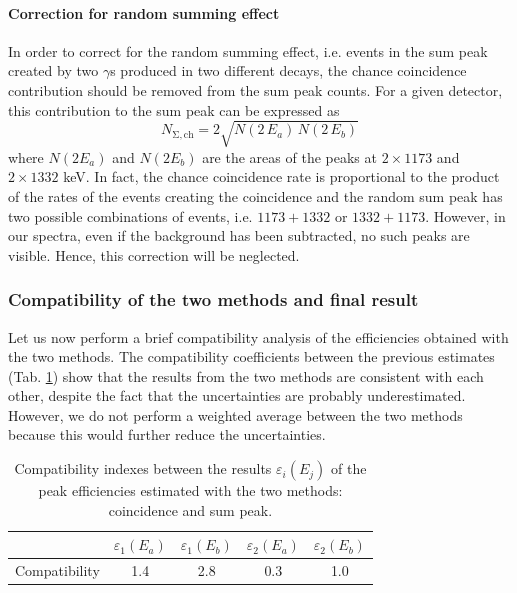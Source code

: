 \documentclass[a4paper]{article}
\begin{document}
\paragraph{Correction for random summing effect}
In order to correct for the random summing effect, i.e. events in the sum peak created by two $\gamma$s produced in two different decays, the chance coincidence contribution should be removed from the sum peak counts. For a given detector, this contribution to the sum peak can be expressed as
\begin{equation}
    N_\mathrm{\Sigma,ch}=2\sqrt{N(2\,E_a)\,N(2\,E_b)}
\end{equation}
where $N(2E_a)$ and $N(2E_b)$ are the areas of the peaks at $2\times 1173$ and $2\times1332$ keV. In fact, the chance coincidence rate is proportional to the product of the rates of the events creating the coincidence and the random sum peak has two possible combinations of events, i.e. $1173+1332$ or $1332+1173$. 
However, in our spectra, even if the background has been subtracted, no such peaks are visible. %
Hence, this correction will be neglected.

\subsubsection{Compatibility of the two methods and final result}
Let us now perform a brief compatibility analysis of the efficiencies obtained with the two methods. The compatibility coefficients between the previous estimates (Tab. \ref{tab:compatibilities and means}) show that the results from the two methods are consistent with each other, despite the fact that the uncertainties are probably underestimated. However, we do not perform a weighted average between the two methods because this would further reduce the uncertainties.
\begin{table}[H]
    \centering
    \captionsetup{width=0.85\linewidth}
    \begin{tabular}{|l|cc|cc|}
         \hline
         & $\varepsilon_{1}(E_a)$&$\varepsilon_{1}(E_b)$&$\varepsilon_{2}(E_a)$& $\varepsilon_{2}(E_b)$\\
         \hline
          Compatibility& 1.4&2.8&0.3&1.0\\
          \hline
    \end{tabular}
    \caption{Compatibility indexes between the results $\varepsilon_{i}(E_j)$ of the peak efficiencies estimated with the two methods: coincidence and sum peak.}
    \label{tab:compatibilities and means}
\end{table}
\end{document}
